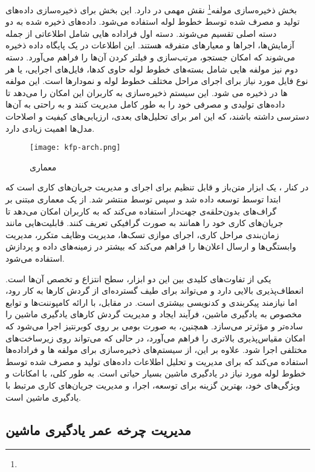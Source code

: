 بخش ذخیره‌سازی مولفه\footnote{} نقش مهمی در  دارد. این بخش برای ذخیره‌سازی داده‌های تولید و مصرف شده توسط خطوط لوله استفاده می‌شود. داده‌های ذخیره شده به دو دسته اصلی تقسیم می‌شوند. دسته اول فراداده هایی  شامل اطلاعاتی از جمله آزمایش‌ها، اجراها و معیارهای متفرقه هستند. این اطلاعات در یک پایگاه داده  ذخیره می‌شوند که امکان جستجو، مرتب‌سازی و فیلتر کردن آن‌ها را فراهم می‌آورد. دسته دوم نیز مولفه هایی شامل بسته‌های خطوط لوله حاوی کدها، فایل‌های اجرایی، یا هر نوع فایل مورد نیاز برای اجرای مراحل مختلف خطوط لوله و نمودارها است. این مولفه ها در  ذخیره می شود. این سیستم ذخیره‌سازی به کاربران این امکان را می‌دهد تا داده‌های تولیدی و مصرفی خود را به طور کامل مدیریت کنند و به راحتی به آن‌ها دسترسی داشته باشند، که این امر برای تحلیل‌های بعدی، ارزیابی‌های کیفیت و اصلاحات مدل‌ها اهمیت زیادی دارد.

\begin{figure}[t]
	\centering
	\texttt{[image: kfp-arch.png]}
	\caption{معماری }
	\label{fig: kfp arch}
\end{figure} 

در کنار ،
  یک ابزار متن‌باز و قابل تنظیم برای اجرای و مدیریت جریان‌های کاری است که ابتدا توسط  توسعه داده شد و سپس توسط  منتشر شد.  از یک معماری مبتنی بر گراف‌های بدون‌حلقه‌ی جهت‌دار استفاده می‌کند که به کاربران امکان می‌دهد تا جریان‌های کاری خود را همانند  به صورت گرافیکی تعریف کنند.  قابلیت‌هایی مانند زمان‌بندی مراحل کاری، اجرای موازی تسک‌ها، مدیریت وظایف متکرر، مدیریت وابستگی‌ها و ارسال اعلان‌ها را فراهم می‌کند که بیشتر در زمینه‌های داده و پردازش  استفاده می‌شود. 
  
 یکی از تفاوت‌های کلیدی بین این دو ابزار، سطح انتزاع و تخصص آن‌ها است.  انعطاف‌پذیری بالایی دارد و می‌تواند برای طیف گسترده‌ای از گردش کارها به کار رود، اما نیازمند پیکربندی و کدنویسی بیشتری است. در مقابل،  با ارائه کامپوننت‌ها و توابع مخصوص به یادگیری ماشین، فرآیند ایجاد و مدیریت گردش کارهای یادگیری ماشین را ساده‌تر و مؤثرتر می‌سازد. همچنین،  به صورت بومی بر روی کوبرنتیز اجرا می‌شود که امکان مقیاس‌پذیری بالاتری را فراهم می‌آورد، در حالی که  می‌تواند روی زیرساخت‌های مختلفی اجرا شود. علاوه بر این،  از سیستم‌های ذخیره‌سازی برای مولفه ها و فراداده‌ها استفاده می‌کند که برای مدیریت و تحلیل اطلاعات داده‌های تولید و مصرف شده توسط خطوط لوله مورد نیاز در یادگیری ماشین بسیار حیاتی است. به طور کلی،  با امکانات و ویژگی‌های خود، بهترین گزینه برای توسعه، اجرا، و مدیریت جریان‌های کاری مرتبط با یادگیری ماشین است.
 
\subsection{مدیریت چرخه عمر یادگیری ماشین}












